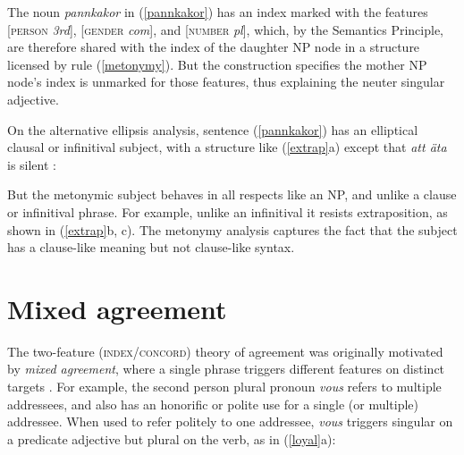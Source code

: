 \documentclass[output=paper
 	        ,biblatex
                ,babelshorthands
                ,newtxmath
                ,draftmode
                ,colorlinks, citecolor=brown
]{langscibook}
\begin{document}
\noindent
The noun \emph{pannkakor} in (\ref{pannkakor}) has an index marked with the features [\textsc{person}  \textit{3rd}], [\textsc{gender} \textit{com}], and [\textsc{number} \textit{pl}], which, by the Semantics Principle, are therefore shared with the index of the daughter NP node in a structure licensed by rule (\ref{metonymy}).  But the construction  specifies the mother NP node's index is unmarked for those features, thus explaining the neuter singular adjective.    

On the alternative ellipsis analysis, sentence (\ref{pannkakor}) has an elliptical clausal or infinitival subject, with a structure like (\ref{extrap}a) except that \emph{att \"{a}ta} is silent \citep{Faarlund:1977, Enger:2004,Josefsson:2009}:  

\begin{exe} 
\ex\label{extrap}
\begin{xlist}
\end{xlist}
\end{exe}

\noindent
But the metonymic subject behaves in all respects like an NP, and unlike a clause or infinitival phrase.  For example, unlike an infinitival it resists extraposition, as shown in (\ref{extrap}b, c).  The metonymy analysis captures the fact that the subject has a clause-like meaning but not clause-like syntax.  
  


\section{Mixed agreement}
\label{mismatch}
 

The two-feature (\textsc{index/concord}) theory of agreement was originally motivated by
\textit{mixed agreement}, where a single phrase triggers different features on distinct targets
\parencites[Chapter~2]{Pollard+Sag:1994}{Kathol99b}.  For example, the  second person plural pronoun \textit{vous} refers to multiple addressees, and also has an honorific or polite use for a single (or multiple) addressee.  When used to refer politely to one addressee, \textit{vous} triggers singular on a predicate adjective but plural on the verb, as in (\ref{loyal}a):
\end{document}
